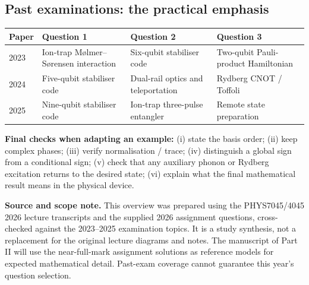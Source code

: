 \vspace{2mm}
\subsection*{Past examinations: the practical emphasis}
\begin{center}
\small
\begin{tabularx}{\linewidth}{@{}p{15mm}XXX@{}}\toprule
Paper&Question 1&Question 2&Question 3\\\midrule
2023&Ion-trap M\o lmer--S\o rensen interaction&Six-qubit stabiliser code&Two-qubit Pauli-product Hamiltonian\\
2024&Five-qubit stabiliser code&Dual-rail optics and teleportation&Rydberg CNOT / Toffoli\\
2025&Nine-qubit stabiliser code&Ion-trap three-pulse entangler&Remote state preparation\\\bottomrule
\end{tabularx}
\end{center}
\textbf{Final checks when adapting an example:} (i) state the basis order; (ii) keep complex phases; (iii) verify normalisation / trace; (iv) distinguish a global sign from a conditional sign; (v) check that any auxiliary phonon or Rydberg excitation returns to the desired state; (vi) explain what the final mathematical result means in the physical device.

\vspace{2mm}
{\footnotesize\color{muted}\textbf{Source and scope note.} This overview was prepared using the PHYS7045/4045 2026 lecture transcripts and the supplied 2026 assignment questions, cross-checked against the 2023--2025 examination topics. It is a study synthesis, not a replacement for the original lecture diagrams and notes. The manuscript of Part II will use the near-full-mark assignment solutions as reference models for expected mathematical detail. Past-exam coverage cannot guarantee this year's question selection.}
